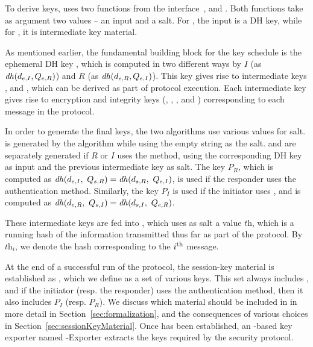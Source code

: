 To derive keys, \mEdhoc{} uses two functions from the \mHkdf{}
interface~\cite{rfc5869}, \mHkdfExtract{} and \mHkdfExpand{}.
%
Both functions take as argument two values -- an input and a salt.
%
For \mHkdfExtract{}, the input is a DH key, while for \mHkdfExpand{},
it is intermediate key material.
%

As mentioned earlier, the fundamental building block for the key schedule is
the ephemeral DH key \mGxy{}, which is computed in two different ways by
$I$ (as $\mathit{dh}(d_{e,I}, Q_{e,R})$) and $R$ (as $\mathit{dh}(d_{e,R}, Q_{e,I})$).
%
This key gives rise to intermediate keys \mPRKtwo{}, \mPRKthree{} and
\mPRKfour{}, which can be derived as part of protocol execution.
%
Each intermediate key gives rise to encryption and integrity keys
(\mKtwoe, \mKtwom{}, \mKthreeae, and \mKthreem)
corresponding to each message in the protocol.
%

In order to generate the final keys, the two \mHkdf{} algorithms use various
values for salt.
%
\mPRKtwo{} is generated by the \mHkdfExtract{} algorithm while using the
empty
string as the salt.
%
\mPRKthree{} and \mPRKfour{} are separately generated if $R$ or $I$ uses the
\mStat{} method, using the corresponding DH key as input and the previous
intermediate key as salt.
%
The key $P_{R}$, which is computed as $\mathit{dh}(d_{e,I},\ Q_{s,R}{}) = \mathit{dh}(d_{s,R},\
Q_{e,I})$, is used if the responder uses the \mStat{} authentication
method.
%
Similarly, the key $P_{I}$ is used if the initiator uses \mStat{}, and is
computed as $\mDH(\mY,\ \mGi{}) = \mDH(\mPriv{I},\ \mGy)$.
%

These intermediate keys are fed into \mHkdfExpand{}, which uses as salt a value $\textit{th}$, which is a running
hash of the information transmitted thus far as part of the protocol.
%
By $\textit{th}_{i}$, we denote the hash corresponding to the $i^{\rm{th}}$ message.
%

At the end of a successful run of the protocol, the session-key material is
established as \mSessKey{}, which we define as a set of various keys.
%
This set always includes \mGxy{}, and if the initiator (resp. the responder) uses
the \mStat{} authentication method, then it also includes $P_{I}$ (resp.
$P_{R}$).
%
We
discuss which material should be included in \mSessKey{} in more detail
in Section~\ref{sec:formalization}, and the consequences of
various choices in Section~\ref{sec:sessionKeyMaterial}.
%
Once \mSessKey{} has been established, an \mHkdf{}-based key exporter
named
\mEdhoc-Exporter extracts the keys required by the security protocol.
%

